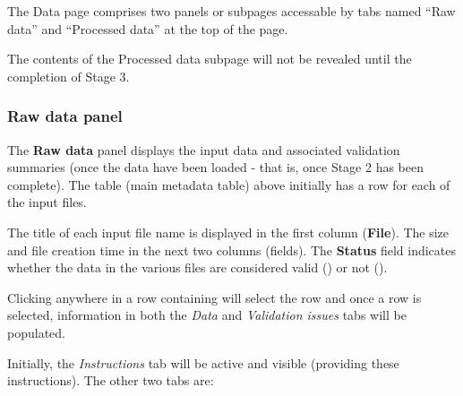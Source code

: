 \documentclass[
  8pt,
  a4paper]{article}
\begin{document}
The Data page comprises two panels or subpages accessable by tabs named
``Raw data'' and ``Processed data'' at the top of the page.

\begin{tcolorbox}[enhanced jigsaw, left=2mm, leftrule=.75mm, bottomrule=.15mm, toptitle=1mm, colbacktitle=quarto-callout-note-color!10!white, bottomtitle=1mm, arc=.35mm, colback=white, breakable, opacitybacktitle=0.6, coltitle=black, colframe=quarto-callout-note-color-frame, titlerule=0mm, toprule=.15mm, opacityback=0, title=\textcolor{quarto-callout-note-color}{\faInfo}\hspace{0.5em}{Note}, rightrule=.15mm]

The contents of the Processed data subpage will not be revealed until
the completion of Stage 3.

\end{tcolorbox}

\subsubsection{Raw data panel}\label{raw-data-panel}

The \textbf{Raw data} panel displays the input data and associated
validation summaries (once the data have been loaded - that is, once
Stage 2 has been complete). The table (main metadata table) above
initially has a row for each of the input files.

The title of each input file name is displayed in the first column
(\textbf{File}). The size and file creation time in the next two columns
(fields). The \textbf{Status} field indicates whether the data in the
various files are considered valid ({}) or not ({}).

Clicking anywhere in a row containing will select the row and once a row
is selected, information in both the \emph{Data} and \emph{Validation
issues} tabs will be populated.

Initially, the \emph{Instructions} tab will be active and visible
(providing these instructions). The other two tabs are:
\end{document}
